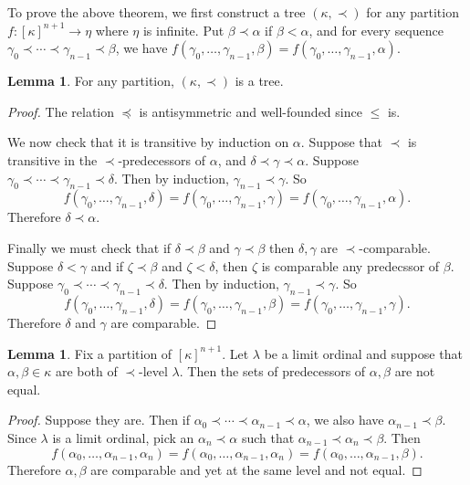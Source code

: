 \documentclass[12pt]{report}
\theoremstyle{definition}
\newtheorem{lemma}[theorem]{Lemma}
\begin{document}
To prove the above theorem, we first construct a tree $(\kappa, \prec)$ for any partition $f: [\kappa]^{n+1} \to \eta$ where $\eta$ is infinite.
Put $\beta \prec \alpha$ if $\beta < \alpha$, and for every sequence $\gamma_0 \prec \cdots \prec \gamma_{n-1} \prec \beta$, we have $f(\gamma_0, \dots, \gamma_{n-1}, \beta) = f(\gamma_0, \dots, \gamma_{n-1}, \alpha)$.
\begin{lemma}
For any partition, $(\kappa, \prec)$ is a tree.
\end{lemma}
\begin{proof}
The relation $\preceq$ is antisymmetric and well-founded since $\leq$ is.

We now check that it is transitive by induction on $\alpha$.
Suppose that $\prec$ is transitive in the $\prec$-predecessors of $\alpha$, and $\delta \prec \gamma \prec \alpha$.
Suppose $\gamma_0 \prec \cdots \prec \gamma_{n-1} \prec \delta$. Then by induction, $\gamma_{n-1} \prec \gamma$. So
$$f(\gamma_0, \dots, \gamma_{n-1}, \delta) = f(\gamma_0, \dots, \gamma_{n-1}, \gamma) = f(\gamma_0, \dots, \gamma_{n-1}, \alpha).$$
Therefore $\delta \prec \alpha$.

Finally we must check that if $\delta \prec \beta$ and $\gamma \prec \beta$ then $\delta,\gamma$ are $\prec$-comparable.
Suppose $\delta < \gamma$ and if $\zeta \prec \beta$ and $\zeta < \delta$, then $\zeta$ is comparable any predecssor of $\beta$.
Suppose $\gamma_0 \prec \cdots \prec \gamma_{n-1} \prec \delta$. Then by induction, $\gamma_{n-1} \prec \gamma$. So
$$f(\gamma_0, \dots, \gamma_{n-1}, \delta) = f(\gamma_0, \dots, \gamma_{n-1}, \beta) = f(\gamma_0, \dots, \gamma_{n-1}, \gamma).$$
Therefore $\delta$ and $\gamma$ are comparable.
\end{proof}
\begin{lemma}
Fix a partition of $[\kappa]^{n+1}$.
Let $\lambda$ be a limit ordinal and suppose that $\alpha,\beta \in \kappa$ are both of $\prec$-level $\lambda$.
Then the sets of predecessors of $\alpha,\beta$ are not equal.
\end{lemma}
\begin{proof}
Suppose they are.
Then if $\alpha_0 \prec \cdots \prec \alpha_{n-1} \prec \alpha$, we also have $\alpha_{n-1} \prec \beta$.
Since $\lambda$ is a limit ordinal, pick an $\alpha_n \prec \alpha$ such that $\alpha_{n-1} \prec \alpha_n \prec \beta$. Then
$$f(\alpha_0, \dots, \alpha_{n-1}, \alpha_n) = f(\alpha_0, \dots, \alpha_{n-1}, \alpha_n) = f(\alpha_0, \dots, \alpha_{n-1}, \beta).$$
Therefore $\alpha,\beta$ are comparable and yet at the same level and not equal.
\end{proof}
\end{document}
